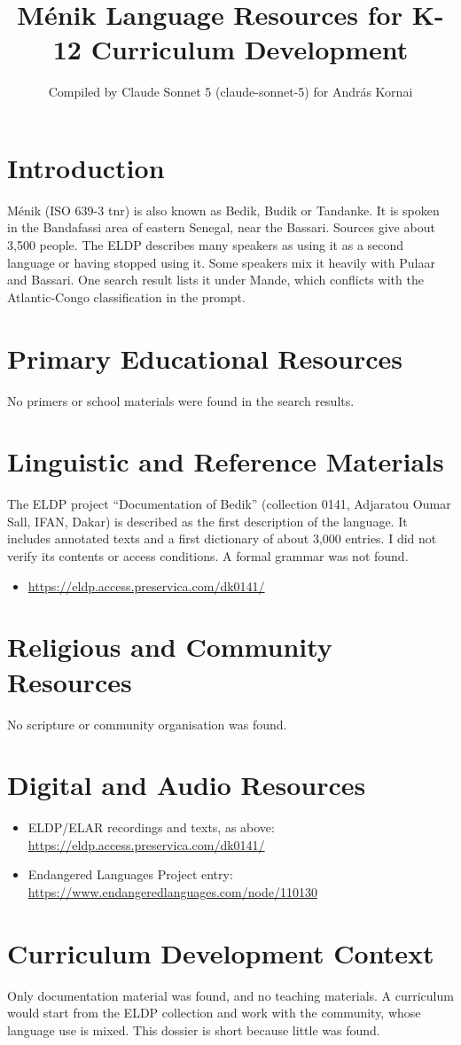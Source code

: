 \documentclass[12pt]{article}
\title{M\'enik Language Resources for K-12 Curriculum Development}
\author{Compiled by Claude Sonnet 5 (claude-sonnet-5) for Andr\'as Kornai}
\date{}
\begin{document}
\maketitle

\section{Introduction}
M\'enik (ISO 639-3 tnr) is also known as Bedik, Budik or Tandanke. It is spoken in the Bandafassi area of eastern Senegal, near the Bassari. Sources give about 3,500 people. The ELDP describes many speakers as using it as a second language or having stopped using it. Some speakers mix it heavily with Pulaar and Bassari. One search result lists it under Mande, which conflicts with the Atlantic-Congo classification in the prompt.

\section{Primary Educational Resources}
No primers or school materials were found in the search results.

\section{Linguistic and Reference Materials}
The ELDP project ``Documentation of Bedik'' (collection 0141, Adjaratou Oumar Sall, IFAN, Dakar) is described as the first description of the language. It includes annotated texts and a first dictionary of about 3,000 entries. I did not verify its contents or access conditions. A formal grammar was not found.
\begin{itemize}
\item \url{https://eldp.access.preservica.com/dk0141/}
\end{itemize}

\section{Religious and Community Resources}
No scripture or community organisation was found.

\section{Digital and Audio Resources}
\begin{itemize}
\item ELDP/ELAR recordings and texts, as above: \url{https://eldp.access.preservica.com/dk0141/}
\item Endangered Languages Project entry: \url{https://www.endangeredlanguages.com/node/110130}
\end{itemize}

\section{Curriculum Development Context}
Only documentation material was found, and no teaching materials. A curriculum would start from the ELDP collection and work with the community, whose language use is mixed. This dossier is short because little was found.
\end{document}
